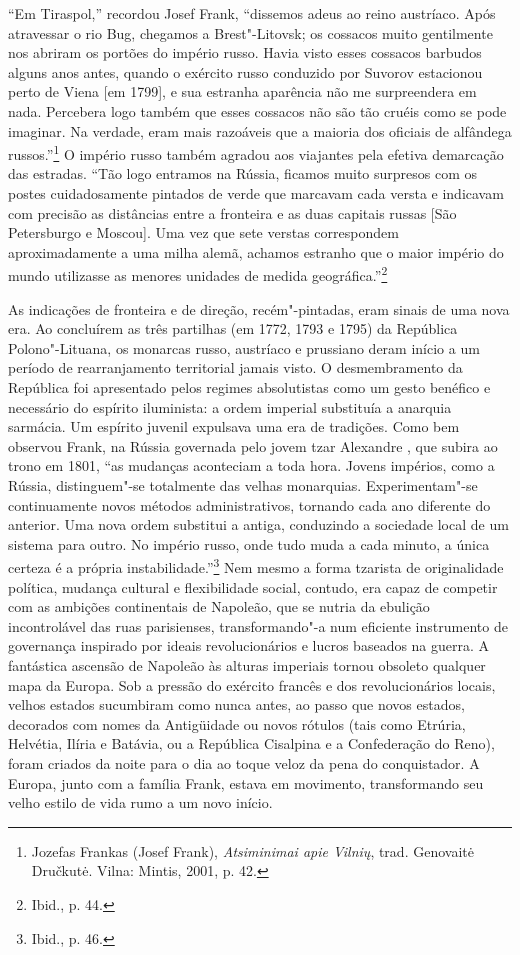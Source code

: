 ``Em Tiraspol,'' recordou Josef Frank, ``dissemos adeus ao reino
austríaco. Após atravessar o rio Bug, chegamos a Brest"-Litovsk; os
cossacos muito gentilmente nos abriram os portões do império russo.
Havia visto esses cossacos barbudos alguns anos antes, quando o exército
russo conduzido por Suvorov estacionou perto de Viena {[}em 1799{]}, e
sua estranha aparência não me surpreendera em nada. Percebera logo
também que esses cossacos não são tão cruéis como se pode imaginar. Na
verdade, eram mais razoáveis que a maioria dos oficiais de alfândega
russos.''\footnote{Jozefas Frankas (Josef Frank), \textit{Atsiminimai apie Vilnių}, trad. Genovaitė Dručkutė. Vilna: Mintis, 2001, p. 42.} O império russo também agradou aos viajantes pela efetiva demarcação das
estradas. ``Tão logo entramos na Rússia, ficamos muito surpresos com os
postes cuidadosamente pintados de verde que marcavam cada versta e
indicavam com precisão as distâncias entre a fronteira e as duas
capitais russas {[}São Petersburgo e Moscou{]}. Uma vez que sete verstas
correspondem aproximadamente a uma milha alemã, achamos estranho que o
maior império do mundo utilizasse as menores unidades de medida
geográfica.''\footnote{Ibid., p. 44.}

As indicações de fronteira e de direção, recém"-pintadas, eram sinais de
uma nova era. Ao concluírem as três partilhas (em 1772, 1793 e 1795) da
República Polono"-Lituana, os monarcas russo, austríaco e prussiano deram
início a um período de rearranjamento territorial jamais visto. O
desmembramento da República foi apresentado pelos regimes absolutistas
como um gesto benéfico e necessário do espírito iluminista: a ordem
imperial substituía a anarquia sarmácia. Um espírito juvenil expulsava
uma era de tradições. Como bem observou Frank, na Rússia governada pelo
jovem tzar Alexandre , que subira ao trono em 1801, ``as mudanças
aconteciam a toda hora. Jovens impérios, como a Rússia, distinguem"-se
totalmente das velhas monarquias. Experimentam"-se continuamente novos
métodos administrativos, tornando cada ano diferente do anterior. Uma
nova ordem substitui a antiga, conduzindo a sociedade local de um
sistema para outro. No império russo, onde tudo muda a cada minuto, a
única certeza é a própria instabilidade.''\footnote{Ibid., p. 46.} Nem
mesmo a forma tzarista de originalidade política, mudança cultural e
flexibilidade social, contudo, era capaz de competir com as ambições
continentais de Napoleão, que se nutria da ebulição incontrolável das
ruas parisienses, transformando"-a num eficiente instrumento de
governança inspirado por ideais revolucionários e lucros baseados na
guerra. A fantástica ascensão de Napoleão às alturas imperiais tornou
obsoleto qualquer mapa da Europa. Sob a pressão do exército francês e
dos revolucionários locais, velhos estados sucumbiram como nunca antes,
ao passo que novos estados, decorados com nomes da Antigüidade ou novos
rótulos (tais como Etrúria, Helvétia, Ilíria e Batávia, ou a República
Cisalpina e a Confederação do Reno), foram criados da noite para o dia
ao toque veloz da pena do conquistador. A Europa, junto com a família
Frank, estava em movimento, transformando seu velho estilo de vida rumo
a um novo início.

